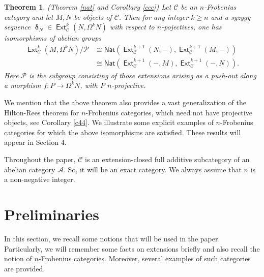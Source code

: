 \documentclass[11pt,a4paper]{amsart}
\newcommand{\old}[1]{{\color{red} #1}}
\newcommand{\rt}{\rightarrow}
\newcommand{\C}{\mathscr{C} }
\newcommand{\p}{\mathfrak{p} }
\def\Ext{\operatorname{{\mathsf{Ext}}}}
\def\syz{\mathsf{\Omega}}
\def\p{\mathcal P}
\def\A{\mathcal A}
\def\de{\operatorname{\boldsymbol{\delta}}}
\newcommand{\nat}{{\mathsf{Nat}}}
\newtheorem{theorem}{Theorem}[section]
\theoremstyle{definition}
\theoremstyle{plain}
\theoremstyle{definition}
\numberwithin{equation}{section}
\begin{document}
\begin{theorem}\label{main2}(Theorem \ref{nat} and Corollary \ref{ccc}) Let $\C$ be an $n$-Frobenius category and let $M, N$ be objects of $\C$. Then for any  integer $k\geq n$ and a syzygy sequence $\de_N\in\Ext^k_{\C}(N, \syz^kN)$ with respect to $n$-pojectives,  one has   isomorphisms of abelian groups
\[\begin{array}{lllll}
\Ext^k_{\C}(M, \syz^kN)/{\p} & \cong \nat(\Ext^{k+1}_{\C}(N, -), \Ext^{k+1}_{\C}(M, -))\\
& \cong \nat(\Ext^{k+1}_{\C}(-, M), \Ext^{k+1}_{\C}(-, N)).
\end{array}\]
Here $\p$ is the subgroup consisting of those extensions arising as a push-out along a morphism $f:P\rt\syz^kN$, with $P$ $n$-projective.
\end{theorem}
We mention that  the above theorem also provides a vast generalization of  the Hilton-Rees theorem for $n$-Frobenius categories, which need not have projective objects, see Corollary \ref{c44}.  We  illustrate some explicit examples of $n$-Frobenius categories for which the above isomorphisms are satisfied. These results will appear in Section 4.



Throughout the paper, $\C$ is an extension-closed full additive subcategory of an abelian category $\A$.  So, it will be an exact category. We always assume that $n$ is a non-negative integer.
 

\section{Preliminaries}

In this section, we recall some notions that will be used in the paper. Particularly, we will remember some facts on extensions briefly and also recall the notion of $n$-Frobenius categories. Moreover, several examples of such categories are provided.
\end{document}
